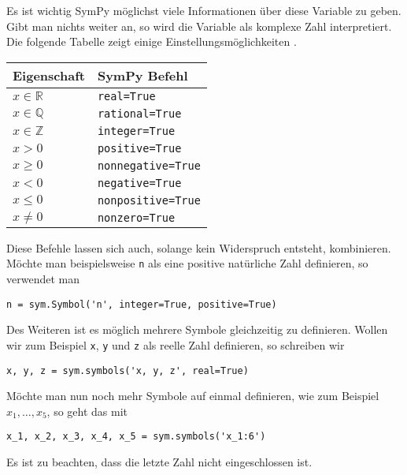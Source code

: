 Es ist wichtig SymPy möglichst viele Informationen  über diese Variable zu geben. Gibt man nichts weiter an, so wird die Variable als komplexe Zahl interpretiert. Die folgende Tabelle zeigt einige Einstellungsmöglichkeiten \cite{SymPy}.

\begin{center}
\begin{tabular}{l l}
Eigenschaft & SymPy Befehl\\
\hline
$x \in \mathbb{R}$ & \lstinline|real=True|\\
$x \in \mathbb{Q}$ & \lstinline|rational=True|\\
$x \in \mathbb{Z}$ & \lstinline|integer=True|\\
$x > 0$ & \lstinline|positive=True|\\
$x \geq 0$ & \lstinline|nonnegative=True|\\
$x < 0$ & \lstinline|negative=True|\\
$x \leq 0$ & \lstinline|nonpositive=True|\\
$x \neq 0$ & \lstinline|nonzero=True|
\end{tabular}
\end{center}

Diese Befehle lassen sich auch, solange kein Widerspruch entsteht, kombinieren. Möchte man beispielsweise \lstinline|n| als eine positive natürliche Zahl definieren, so verwendet man

\begin{lstlisting}
n = sym.Symbol('n', integer=True, positive=True)
\end{lstlisting}

Des Weiteren ist es möglich mehrere Symbole gleichzeitig zu definieren. Wollen wir zum Beispiel \lstinline|x|, \lstinline|y| und \lstinline|z| als reelle Zahl definieren, so schreiben wir

\begin{lstlisting}
x, y, z = sym.symbols('x, y, z', real=True)
\end{lstlisting}

Möchte man nun noch mehr Symbole auf einmal definieren, wie zum Beispiel $x_1, \dots, x_5$, so geht das mit

\begin{lstlisting}
x_1, x_2, x_3, x_4, x_5 = sym.symbols('x_1:6')
\end{lstlisting}

Es ist zu beachten, dass die letzte Zahl nicht eingeschlossen ist.\\

